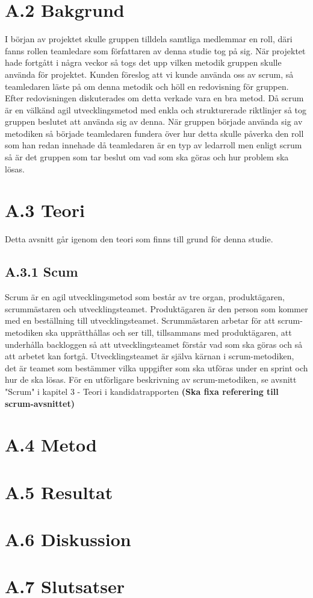 \section{A.2 Bakgrund}
I början av projektet skulle gruppen tilldela samtliga medlemmar en roll, däri fanns rollen teamledare som författaren av denna studie tog på sig. När projektet hade fortgått i några veckor så togs det upp vilken metodik gruppen skulle använda för projektet. Kunden föreslog att vi kunde använda oss av scrum, så teamledaren läste på om denna metodik och höll en redovisning för gruppen. Efter redovisningen diskuterades om detta verkade vara en bra metod. Då scrum är en välkänd agil utvecklingsmetod med enkla och strukturerade riktlinjer så tog gruppen beslutet att använda sig av denna. När gruppen började använda sig av metodiken så började teamledaren fundera över hur detta skulle påverka den roll som han redan innehade då teamledaren är en typ av ledarroll men enligt scrum så är det gruppen som tar beslut om vad som ska göras och hur problem ska lösas.

\section{A.3 Teori}
Detta avsnitt går igenom den teori som finns till grund för denna studie.

\subsection{A.3.1 Scum}
Scrum är en agil utvecklingsmetod som består av tre organ, produktägaren, scrummästaren och utvecklingsteamet. Produktägaren är den person som kommer med en beställning till utvecklingsteamet. Scrummästaren arbetar för att scrum-metodiken ska upprätthållas och ser till, tillsammans med produktägaren, att underhålla backloggen så att utvecklingsteamet förstår vad som ska göras och så att arbetet kan fortgå. Utvecklingsteamet är själva kärnan i scrum-metodiken, det är teamet som bestämmer vilka uppgifter som ska utföras under en sprint och hur de ska lösas. För en utförligare beskrivning av scrum-metodiken, se avsnitt "Scrum" i kapitel 3 - Teori i kandidatrapporten \textbf{(Ska fixa referering till scrum-avsnittet)}

\section{A.4 Metod}

\section{A.5 Resultat}

\section{A.6 Diskussion}

\section{A.7 Slutsatser}

